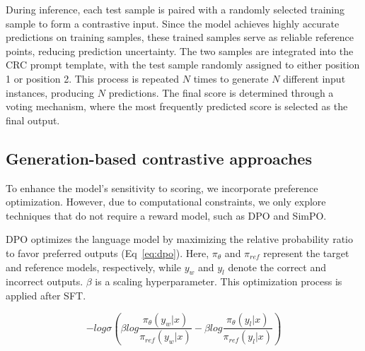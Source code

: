 \documentclass[11pt]{article}
\begin{document}

During inference, each test sample is paired with a randomly selected training sample to form a contrastive input. Since the model achieves highly accurate predictions on training samples, these trained samples serve as reliable reference points, reducing prediction uncertainty. The two samples are integrated into the CRC prompt template, with the test sample randomly assigned to either position 1 or position 2. This process is repeated $N$ times to generate $N$ different input instances, producing $N$ predictions. The final score is determined through a voting mechanism, where the most frequently predicted score is selected as the final output.

\subsection{Generation-based contrastive approaches}


To enhance the model’s sensitivity to scoring, we incorporate preference optimization. However, due to computational constraints, we only explore techniques that do not require a reward model, such as DPO and SimPO.


DPO optimizes the language model by maximizing the relative probability ratio to favor preferred outputs (Eq~\ref{eq:dpo}). Here, $\pi_{\theta}$ and $\pi_{ref}$ represent the target and reference models, respectively, while $y_w$ and $y_l$ denote the correct and incorrect outputs. $\beta$ is a scaling hyperparameter. This optimization process is applied after SFT.

\begin{equation}
\label{eq:dpo}
-log\sigma(\beta log \frac{\pi_{\theta}(y_w|x)}{\pi_{ref}(y_w|x)} - \beta log \frac{\pi_{\theta}(y_l|x)}{\pi_{ref}(y_l|x)} )
\end{equation}
\end{document}
